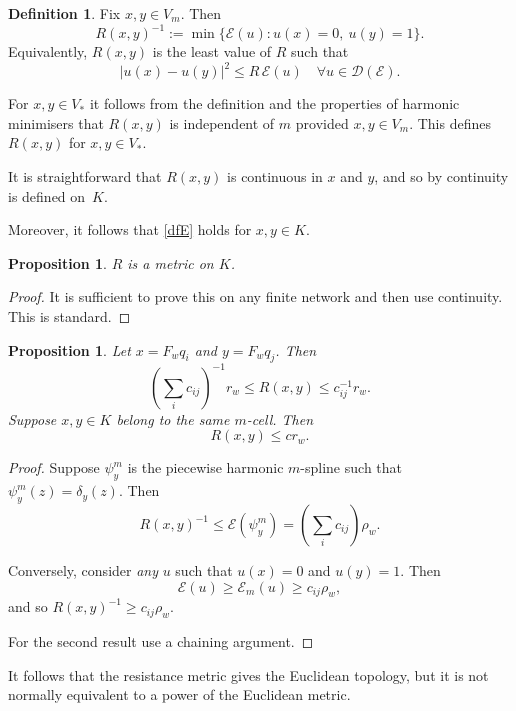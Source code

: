 \documentclass[a4paper]{amsart}
\theoremstyle{plain}
\newtheorem{proposition}[theorem]{Proposition}
\theoremstyle{definition}
\newtheorem{definition}[theorem]{Definition}%
\theoremstyle{remark}
\begin{document}
\begin{definition}
Fix $ x,y \in V_m $.  Then
\begin{equation} \label{dfE} 
R(x,y)^{-1} := \min \{ \mathcal{E} (u) : u(x) = 0,\ u(y) = 1 \}. 
\end{equation} 
Equivalently, $ R(x,y) $ is the least value of $ R $ such that 
\[
|u(x) - u(y)|^2 \leq R\, \mathcal{E} (u) \quad \forall u \in \mathcal{D} ( \mathcal{E}  ).
\]

For $ x,y \in V_* $ it follows from the definition and the properties of harmonic minimisers that    $ R(x,y) $ is independent of $ m $ provided $ x,y\in V_m $.  This defines $ R(x,y) $ for $ x,y \in V_* $.  

It is straightforward that $ R(x,y) $ is continuous in $ x $ and $ y $, and so by continuity is defined on~$ K $. 

Moreover, it follows that \eqref{dfE}   holds for $ x,y\in K $.
\end{definition}

\begin{proposition} 
$ R $ is a metric on $ K $.
\end{proposition}

\begin{proof} It is sufficient to prove this on any finite network and then use continuity.  This is standard.
\end{proof}

\begin{proposition} Let $ x= F_w q_i $ and $ y = F_w q_j $. 
Then
\[ 
 \left(\sum_i c_{ij}\right)^{-1} r_w \leq R(x,y) \leq c_{ij}^{-1} r_w .
 \]
  Suppose $ x , y \in K$ belong to the same $ m $-cell.  Then
  \[
  R(x,y) \le c  r_ w .
  \]
 \end{proposition}
 
 \begin{proof} Suppose $ \psi_y^m $ is the piecewise harmonic $ m $-spline such that $  \psi_y^m(z) = \delta _y(z) $. Then
  \[
 R(x,y)^{-1}  \leq \mathcal{E} ( \psi_y^m ) =  \left(\sum_i c_{ij}\right)  \rho _w .
 \]
 
 Conversely, consider \emph{any} $ u $ such that  $ u(x) = 0 $ and $ u(y) = 1 $.  Then 
\[
 \mathcal{E} (u) \geq \mathcal{E} _m (u)  \geq c_{ij} \rho_w,
\]
and so $ R(x,y)^{-1} \geq c_{ij} \rho_w $.

For the second result use a chaining argument.
\end{proof}  

It follows that the resistance metric gives the Euclidean topology, but it is not normally equivalent to a power of the Euclidean metric.
\end{document}
